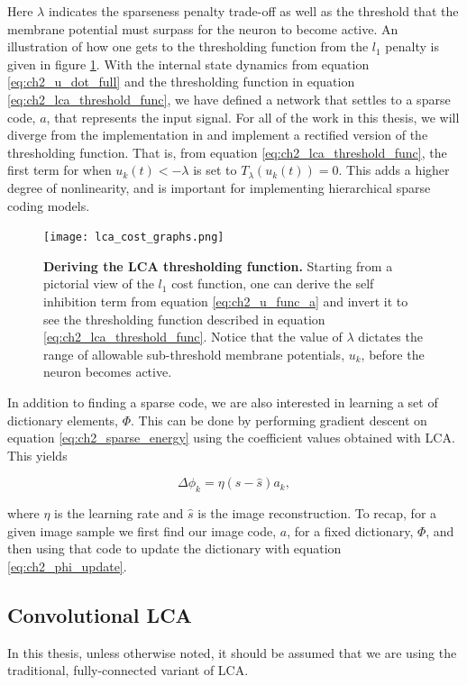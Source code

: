 Here $\lambda$ indicates the sparseness penalty trade-off as well as the threshold that the membrane potential must surpass for the neuron to become active. An illustration of how one gets to the thresholding function from the $l_{1}$ penalty is given in figure \ref{fig:ch2_lca_thresh}. With the internal state dynamics from equation \eqref{eq:ch2_u_dot_full} and the thresholding function in equation \eqref{eq:ch2_lca_threshold_func}, we have defined a network that settles to a sparse code, $a$, that represents the input signal. For all of the work in this thesis, we will diverge from the implementation in \parencite{rozell2008sparse} and implement a rectified version of the thresholding function. That is, from equation \ref{eq:ch2_lca_threshold_func}, the first term for when $u_{k}(t) < -\lambda$ is set to $T_{\lambda}(u_{k}(t))=0$. This adds a higher degree of nonlinearity, and is important for implementing hierarchical sparse coding models.

\begin{figure}[h]\label{fig:ch2_lca_thresh}
\centering %
\texttt{[image: lca\_cost\_graphs.png]}
\caption{\textbf{Deriving the LCA thresholding function.} Starting from a pictorial view of the $l_{1}$ cost function, one can derive the self inhibition term from equation \eqref{eq:ch2_u_func_a} and invert it to see the thresholding function described in equation \eqref{eq:ch2_lca_threshold_func}. Notice that the value of $\lambda$ dictates the range of allowable sub-threshold membrane potentials, $u_{k}$, before the neuron becomes active.}
\end{figure}

In addition to finding a sparse code, we are also interested in learning a set of dictionary elements, $\Phi$. This can be done by performing gradient descent on equation \eqref{eq:ch2_sparse_energy} using the coefficient values obtained with LCA. This yields

\begin{equation}\label{eq:ch2_phi_update}
    \Delta \phi_{k} = \eta (s - \hat{s}) a_{k},
\end{equation}

\noindent where $\eta$ is the learning rate and $\hat{s}$ is the image reconstruction. To recap, for a given image sample we first find our image code, $a$, for a fixed dictionary, $\Phi$, and then using that code to update the dictionary with equation \eqref{eq:ch2_phi_update}.


\subsection{Convolutional LCA}
In this thesis, unless otherwise noted, it should be assumed that we are using the traditional, fully-connected variant of LCA.

